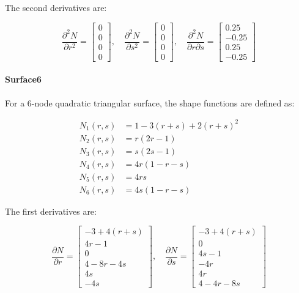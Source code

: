 The second derivatives are:

\[
\frac{\partial^2 N}{\partial r^2} =
\begin{bmatrix}
0 \\
0 \\
0 \\
0
\end{bmatrix}, \quad
\frac{\partial^2 N}{\partial s^2} =
\begin{bmatrix}
0 \\
0 \\
0 \\
0
\end{bmatrix}, \quad
\frac{\partial^2 N}{\partial r \partial s} =
\begin{bmatrix}
0.25 \\
-0.25 \\
0.25 \\
-0.25
\end{bmatrix}
\]
\paragraph{Surface6} For a 6-node quadratic triangular surface, the shape functions are defined as:

\[
\begin{aligned}
N_1(r, s) &= 1 - 3(r + s) + 2(r + s)^2 \\
N_2(r, s) &= r(2r - 1) \\
N_3(r, s) &= s(2s - 1) \\
N_4(r, s) &= 4r(1 - r - s) \\
N_5(r, s) &= 4rs \\
N_6(r, s) &= 4s(1 - r - s)
\end{aligned}
\]

The first derivatives are:

\[
\frac{\partial N}{\partial r} =
\begin{bmatrix}
-3 + 4(r + s) \\
4r - 1 \\
0 \\
4 - 8r - 4s \\
4s \\
-4s
\end{bmatrix}, \quad
\frac{\partial N}{\partial s} =
\begin{bmatrix}
-3 + 4(r + s) \\
0 \\
4s - 1 \\
-4r \\
4r \\
4 - 4r - 8s
\end{bmatrix}
\]

